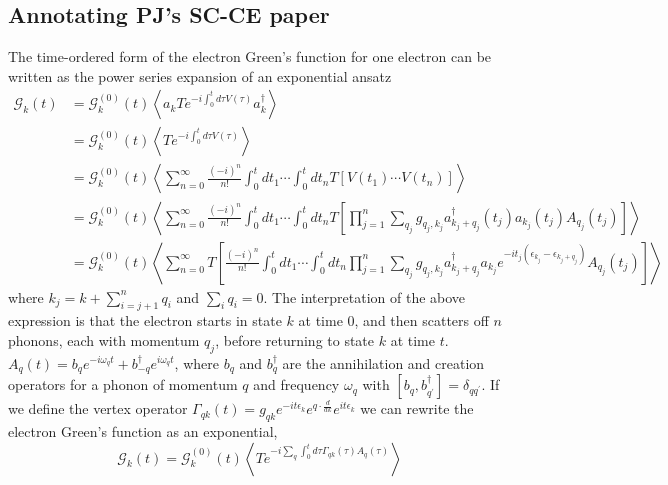 \subsection{Annotating PJ's SC-CE paper}
 The time-ordered form of the electron Green's function for one electron can be written as the power series expansion of an exponential ansatz
\begin{align}
\mathcal{G}_k(t)&=\mathcal{G}_k^{(0)}(t)\left\langle a_k T e^{-i \int_0^t d \tau V({\tau})} a_k^\dag\right\rangle
\label{6.5}\\
&=\mathcal{G}_k^{(0)}(t)\left\langle T e^{-i \int_0^t d \tau V({\tau})}\right\rangle \\
&=\mathcal{G}_k^{(0)}(t) \left\langle \sum_{n=0}^{\infty} \frac{(-i)^n}{n!} \int_0^t d t_1 \cdots \int_0^t d t_n T\left[V ( t _ { 1 } ) \cdots V \left(t_n\right)\right] \right\rangle \\
&=\mathcal{G}_k^{(0)}(t) \left\langle \sum_{n=0}^{\infty} \frac{(-i)^n}{n!} \int_0^t d t_1 \cdots \int_0^t d t_n T\left[\prod_{j=1}^n \sum_{q_j} g_{q_j, k_j} a_{k_j+q_j}^{\dagger}\left(t_j\right) a_{k_j}\left(t_j\right) A_{q_j}\left(t_j\right)\right] \right\rangle \\
&=\mathcal{G}_k^{(0)}(t) \left\langle \sum_{n=0}^{\infty} T \left[\frac{(-i)^n}{n!} \int_0^t d t_1 \cdots \int_0^t d t_n \prod_{j=1}^n \sum_{q_j} g_{q_j, k_j} a_{k_j+q_j}^{\dagger} a_{k_j}e^{-it_j(\epsilon_{k_j}-\epsilon_{k_j + q_j})} A_{q_j}\left(t_j\right)\right] \right\rangle 
\end{align}
where $k_j = k + \sum_{i=j+1}^n q_i$ and $\sum_i q_i=0$. The interpretation of the above expression is that the electron starts in state $k$ at time $0$, and then scatters off $n$ phonons, each with momentum $q_j$, before returning to state $k$ at time $t$. $A_q(t)=b_q e^{-i \omega_q t}+b_{-q}^\dagger e^{i \omega_q t}$, where $b_q$ and $b_q^\dagger$ are the annihilation and creation operators for a phonon of momentum $q$ and frequency $\omega_q$ with $[b_q, b_{q^{\prime}}^{\dagger}]=\delta_{q q^{\prime}}$. If we define the vertex operator $\Gamma_{q k}(t)=g_{q k} e^{-i t \epsilon_k} e^{q \cdot \frac{d}{d k}} e^{i t \epsilon_k}$ we can rewrite the electron Green's function as an exponential,
\begin{equation}
\mathcal{G}_k(t)=\mathcal{G}_k^{(0)}(t)\left\langle T e^{-i \sum_q \int_0^t d \tau \Gamma_{q k}(\tau) A_q(\tau)}\right\rangle
\end{equation}
